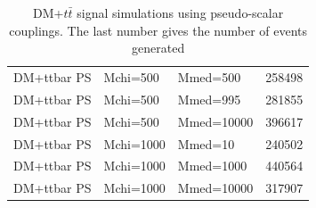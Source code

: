 \begin{table}[]
\begin{tabular}{llll}
DM+ttbar  PS & Mchi=500  & Mmed=500   & 258498 \\
DM+ttbar  PS & Mchi=500  & Mmed=995   & 281855 \\
DM+ttbar  PS & Mchi=500  & Mmed=10000 & 396617 \\
DM+ttbar  PS & Mchi=1000 & Mmed=10    & 240502 \\
DM+ttbar  PS & Mchi=1000 & Mmed=1000  & 440564 \\
DM+ttbar  PS & Mchi=1000 & Mmed=10000 & 317907 \\
\hline \hline
\end{tabular}
\caption{DM+$t\bar{t}$ signal simulations using pseudo-scalar couplings. The last number gives the number of events generated}
\label{tab:dmtt_ps}
\end{table}



